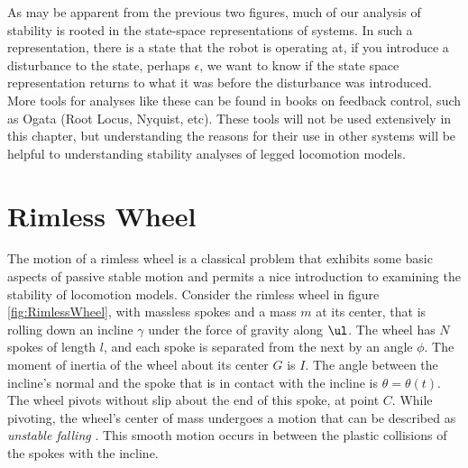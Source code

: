 As may be apparent from the previous two figures, much of our analysis of stability is rooted in the state-space representations of systems. In such a representation, there is a state that the robot is operating at, if you introduce a disturbance to the state, perhaps $\epsilon$, we want to know if the state space representation returns to what it was before the disturbance was introduced. More tools for analyses like these can be found in books on feedback control, such as Ogata \cite{ogata04} (Root Locus, Nyquist, etc). These tools will not be used extensively in this chapter, but understanding the reasons for their use in other systems will be helpful to understanding stability analyses of legged locomotion models. 


\section{Rimless Wheel} %
\label{sec:RimlessWheel}

The motion of a rimless wheel is a classical problem that exhibits some basic aspects of passive stable motion and permits a nice introduction to examining the stability of locomotion models. Consider the rimless wheel in figure \ref{fig:RimlessWheel}, with massless spokes and a mass $m$ at its center, that is rolling down an incline $\gamma$ under the force of gravity along $\ul$. The wheel has $N$ spokes of length $l$, and each spoke is separated from the next by an angle $\phi$. The moment of inertia of the wheel about its center $G$ is $I$. The angle between the incline's normal and the spoke that is in contact with the incline is $\theta = \theta(t)$. The wheel pivots without slip about the end of this spoke, at point $C$. While pivoting, the wheel's center of mass undergoes a motion that can be described as \textit{unstable falling} \cite{coleman96}. This smooth motion occurs in between the plastic collisions of the spokes with the incline.

